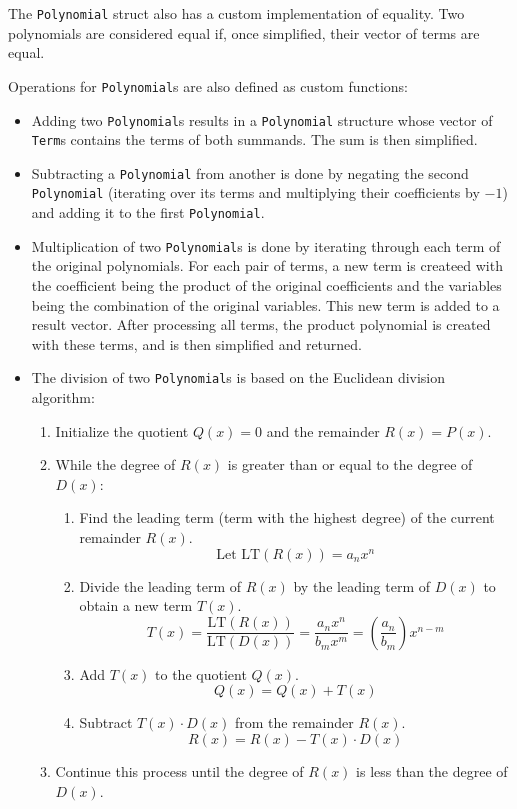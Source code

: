The \verb|Polynomial| struct also has a custom implementation of equality. Two polynomials are considered equal if, once simplified, their vector of terms are equal.

Operations for \verb|Polynomial|s are also defined as custom functions:

\begin{itemize}
    \item Adding two \verb|Polynomial|s results in a \verb|Polynomial| structure whose vector of \verb|Term|s contains the terms of both summands. The sum is then simplified.
    \item Subtracting a \verb|Polynomial| from another is done by negating the second \verb|Polynomial| (iterating over its terms and multiplying their coefficients by $-1$) and adding it to the first \verb|Polynomial|.
    \item Multiplication of two \verb|Polynomial|s is done by iterating through each term of the original polynomials. For each pair of terms, a new term is createed with the coefficient being the product of the original coefficients and the variables being the combination of the original variables. This new term is added to a result vector. After processing all terms, the product polynomial is created with these terms, and is then simplified and returned.
    \item The division of two \verb|Polynomial|s is based on the Euclidean division algorithm:
    \begin{enumerate}
        \item Initialize the quotient \( Q(x) = 0 \) and the remainder \( R(x) = P(x) \).
        \item While the degree of \( R(x) \) is greater than or equal to the degree of \( D(x) \):
        \begin{enumerate}
            \item Find the leading term (term with the highest degree) of the current remainder \( R(x) \).
            \[
            \text{Let } \text{LT}(R(x)) = a_n x^n
            \]
            \item Divide the leading term of \( R(x) \) by the leading term of \( D(x) \) to obtain a new term \( T(x) \).
            \[
            T(x) = \frac{\text{LT}(R(x))}{\text{LT}(D(x))} = \frac{a_n x^n}{b_m x^m} = \left( \frac{a_n}{b_m} \right) x^{n-m}
            \]
            \item Add \( T(x) \) to the quotient \( Q(x) \).
            \[
            Q(x) = Q(x) + T(x)
            \]
            \item Subtract \( T(x) \cdot D(x) \) from the remainder \( R(x) \).
            \[
            R(x) = R(x) - T(x) \cdot D(x)
            \]
        \end{enumerate}
        \item Continue this process until the degree of \( R(x) \) is less than the degree of \( D(x) \).
    \end{enumerate}
\end{itemize}


